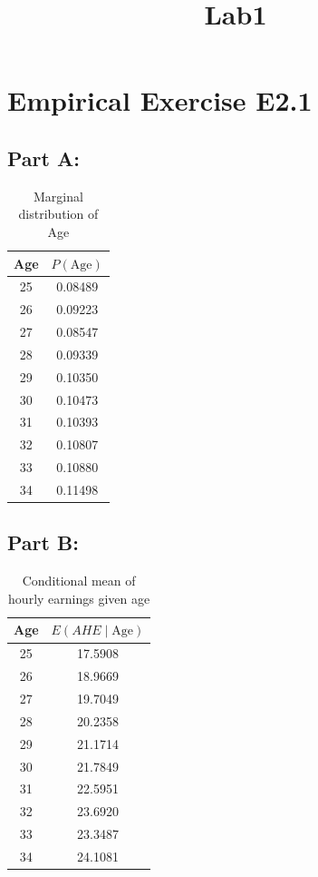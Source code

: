 \documentclass[
]{article}
\title{Lab1}
\author{}
\date{\vspace{-2.5em}}
\begin{document}
\maketitle

\section{Empirical Exercise E2.1}\label{empirical-exercise-e2.1}

\subsection{Part A:}\label{part-a}

\begin{table}[h]
\centering
\begin{tabular}{cc}
\hline
Age & $P(\text{Age})$ \\
\hline
25 & 0.08489 \\
26 & 0.09223 \\
27 & 0.08547 \\
28 & 0.09339 \\
29 & 0.10350 \\
30 & 0.10473 \\
31 & 0.10393 \\
32 & 0.10807 \\
33 & 0.10880 \\
34 & 0.11498 \\
\hline
\end{tabular}
\caption{Marginal distribution of Age}
\end{table}

\subsection{Part B:}\label{part-b}

\begin{table}[h]
\centering
\begin{tabular}{cc}
\hline
Age & $E(AHE \mid \text{Age})$ \\
\hline
25 & 17.5908 \\
26 & 18.9669 \\
27 & 19.7049 \\
28 & 20.2358 \\
29 & 21.1714 \\
30 & 21.7849 \\
31 & 22.5951 \\
32 & 23.6920 \\
33 & 23.3487 \\
34 & 24.1081 \\
\hline
\end{tabular}
\caption{Conditional mean of hourly earnings given age}
\end{table}
\end{document}
